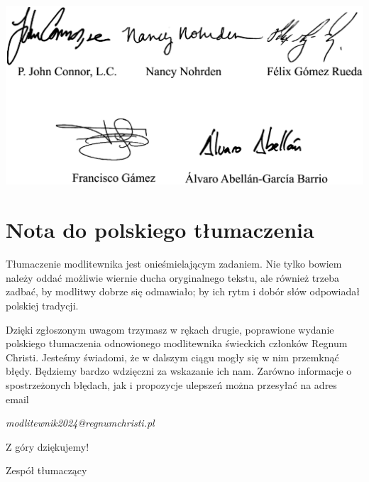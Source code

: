 ﻿\documentclass[9pt,twoside]{extarticle}
\begin{document}
\begin{center}
\includegraphics[width=\textwidth]{podpisy}
\end{center}








\setmainfont{HelveticaNeue}
\setlength{\parskip}{1em}
\setlength{\parindent}{0pt}


\cleardoublepage


\section*{Nota do polskiego tłumaczenia}


Tłumaczenie modlitewnika jest onieśmielającym zadaniem. Nie tylko bowiem należy oddać możliwie wiernie ducha oryginalnego tekstu, ale również trzeba zadbać, by modlitwy dobrze się odmawiało; by ich rytm i dobór słów odpowiadał polskiej tradycji. 


Dzięki zgłoszonym uwagom trzymasz w rękach drugie, poprawione wydanie polskiego tłumaczenia odnowionego modlitewnika świeckich członków Regnum Christi. Jesteśmy świadomi, że w dalszym ciągu mogły się w nim przemknąć błędy. Będziemy bardzo wdzięczni za wskazanie ich nam. Zarówno informacje o spostrzeżonych błędach, jak i propozycje ulepszeń można przesyłać na adres email 


\begin{center}
{\em modlitewnik2024@regnumchristi.pl}
\end{center}


Z góry dziękujemy!


Zespół tłumaczący




\cleardoublepage


\tableofcontents


\cleardoublepage
\end{document}

